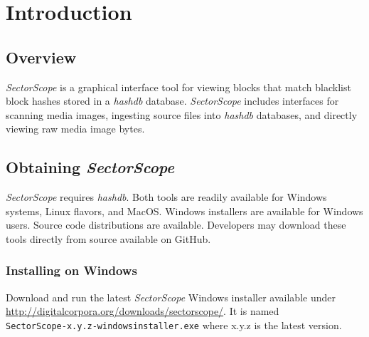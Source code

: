 \documentclass[11pt,fleqn]{article} %
\begin{document}
\newcommand \sscope {\textit{SectorScope}\xspace}
\newcommand \hdb {\textit{hashdb}\xspace}
\newcommand \aut {\textit{Autopsy}\xspace}
\newcommand \bulk {\textit{bulk\_extractor}\xspace}





\setlength{\parindent}{0pt} %
\newpage
\thispagestyle{empty}
\mbox{}
\newpage

\tableofcontents
\newpage
{}
\newpage

\section{Introduction}
\label{intro}
\subsection {Overview}
\sscope is a graphical interface tool for viewing blocks that match blacklist block hashes stored in a \hdb database. \sscope includes interfaces for scanning media images, ingesting source files into \hdb databases, and directly viewing raw media image bytes.\\

\subsection{Obtaining \sscope}
\label{Obtaining}
\sscope requires \hdb. Both tools are readily available for Windows systems, Linux flavors, and MacOS.  Windows installers are available for Windows users.  Source code distributions are available.  Developers may download these tools directly from source available on GitHub.\\

\subsubsection{Installing on Windows}
Download and run the latest \sscope Windows installer available under \url{http://digitalcorpora.org/downloads/sectorscope/}. It is named\\
\verb+SectorScope-x.y.z-windowsinstaller.exe+ where x.y.z is the latest version.\\
\end{document}
